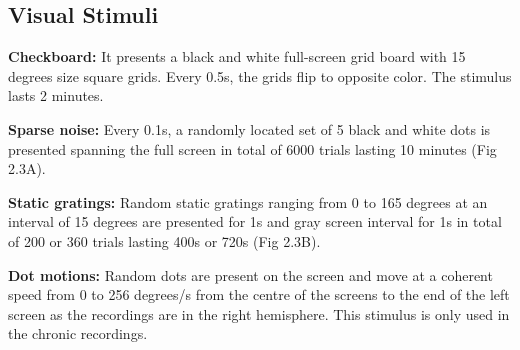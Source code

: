 \subsection{Visual Stimuli}
\textbf{Checkboard:} It presents a black and white full-screen grid board with 15 degrees size square grids. Every 0.5s, the grids flip to opposite color. The stimulus lasts 2 minutes.

\textbf{Sparse noise:} Every 0.1s, a randomly located set of 5 black and white dots is presented spanning the full screen in total of 6000 trials lasting 10 minutes (Fig 2.3A).

\textbf{Static gratings:} Random static gratings ranging from 0 to 165 degrees at an interval of 15 degrees are presented for 1s and gray screen interval for 1s in total of 200 or 360 trials lasting 400s or 720s (Fig 2.3B).

\textbf{Dot motions:} Random dots are present on the screen and move at a coherent speed from 0 to 256 degrees/s from the centre of the screens to the end of the left screen as the recordings are in the right hemisphere. This stimulus is only used in the chronic recordings.

